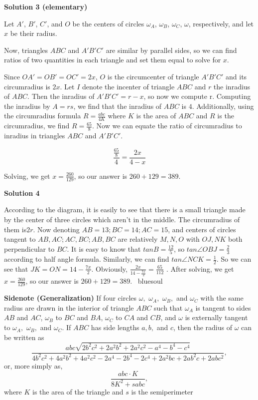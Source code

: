 \begin{enumerate}
 



\textbf{Solution 3 (elementary)}

Let $A'$, $B'$, $C'$, and $O$ be the centers of circles $\omega_{A}$, $\omega_{B}$, $\omega_{C}$, $\omega$, respectively, and let $x$ be their radius.

 Now, triangles $ABC$ and $A'B'C'$ are similar by parallel sides, so we can find ratios of two quantities in each triangle and set them equal to solve for $x$.

 Since $OA'=OB'=OC'=2x$, $O$ is the circumcenter of triangle $A'B'C'$ and its circumradius is $2x$. Let $I$ denote the incenter of triangle $ABC$ and $r$ the inradius of $ABC$. Then the inradius of $A'B'C'=r-x$, so now we compute r. Computing the inradius by $A=rs$, we find that the inradius of $ABC$ is $4$. Additionally, using the circumradius formula $R=\frac{abc}{4K}$ where $K$ is the area of $ABC$ and $R$ is the circumradius, we find $R=\frac{65}{8}$. Now we can equate the ratio of circumradius to inradius in triangles $ABC$ and $A'B'C'$.

 
 \[\frac{\frac{65}{8}}{4}=\frac{2x}{4-x}\]

 Solving, we get $x=\frac{260}{129}$, so our answer is $260+129=\boxed{389}$.

 



\textbf{Solution 4}

According to the diagram, it is easily to see that there is a small triangle made by the center of three circles which aren't in the middle. The circumradius of them is$2r$. Now denoting $AB=13;BC=14;AC=15$, and centers of circles tangent to $AB,AC;AC,BC;AB,BC$ are relatively $M,N,O$ with $OJ,NK$ both perpendicular to $BC$. It is easy to know that $tanB=\frac{12}{5}$, so $tan\angle OBJ=\frac{2}{3}$ according to half angle formula. Similarly, we can find $tan\angle NCK=\frac{1}{2}$. So we can see that $JK=ON=14-\frac{7x}{2}$. Obviously, $\frac{2x}{14-\frac{7x}{2}}=\frac{65}{112}$ . After solving, we get$x=\frac{260}{129}$, so our answer is $260+129=\boxed{389}$. ~bluesoul

 \textbf{Sidenote (Generalization)} If four circles $\omega,$ $\omega_{A},$ $\omega_{B},$ and $\omega_{C}$ with the same radius are drawn in the interior of triangle $ABC$ such that $\omega_{A}$ is tangent to sides $AB$ and $AC$, $\omega_{B}$ to $BC$ and $BA$, $\omega_{C}$ to $CA$ and $CB$, and $\omega$ is externally tangent to $\omega_{A},$ $\omega_{B},$ and $\omega_{C}$. If $ABC$ has side lengths $a,b,$ and $c$, then the radius of $\omega$ can be written as 
 \[\frac{abc\sqrt{2b^{2}c^{2}+2a^{2}b^{2}+2a^{2}c^{2}-a^{4}-b^{4}-c^{4}}}{4b^{2}c^{2}+4a^{2}b^{2}+4a^{2}c^{2}-2a^{4}-2b^{4}-2c^{4}+2a^{2}bc+2ab^{2}c+2abc^{2}},\] or, more simply as, 
 \[\frac{abc\cdot K}{8K^{2}+sabc},\] where $K$ is the area of the triangle and $s$ is the semiperimeter


\end{enumerate}
